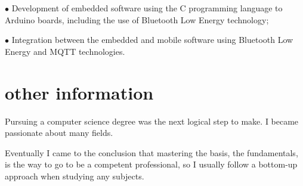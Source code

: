 \documentclass[]{../document-class/twentysecondcv}
\begin{document}
\begin{twenty}
{		$\bullet$ Development of embedded software using the C programming language to Arduino boards, including the use of Bluetooth Low Energy technology;\vskip 4pt 

		$\bullet$ Integration between the embedded and mobile software using Bluetooth Low Energy and MQTT technologies.}
		


\end{twenty}


\section{other information}

Pursuing a computer science degree was the next logical step to make. I became passionate about many fields.

Eventually I came to the conclusion that mastering the basis, the fundamentals, is the way to go to be a competent professional, so I usually follow a bottom-up approach when studying any subjects.




\end{document}

